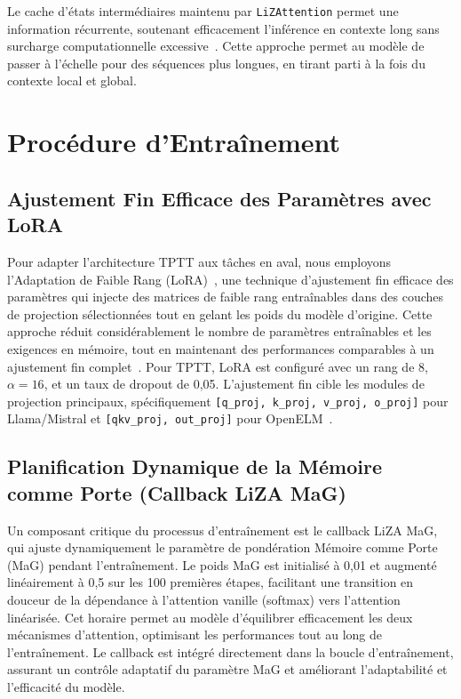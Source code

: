 \documentclass[10pt,a4paper]{article}
\begin{document}
Le cache d'états intermédiaires maintenu par \texttt{LiZAttention} permet une information récurrente, soutenant efficacement l'inférence en contexte long sans surcharge computationnelle excessive~\cite{katharopoulos2020transformers}. Cette approche permet au modèle de passer à l'échelle pour des séquences plus longues, en tirant parti à la fois du contexte local et global.

\section{Procédure d'Entraînement}

\subsection{Ajustement Fin Efficace des Paramètres avec LoRA}

Pour adapter l'architecture TPTT aux tâches en aval, nous employons l'Adaptation de Faible Rang (LoRA)~\cite{hu2022lora, lora_hf}, une technique d'ajustement fin efficace des paramètres qui injecte des matrices de faible rang entraînables dans des couches de projection sélectionnées tout en gelant les poids du modèle d'origine. Cette approche réduit considérablement le nombre de paramètres entraînables et les exigences en mémoire, tout en maintenant des performances comparables à un ajustement fin complet~\cite{hu2022lora, lora_hf}. Pour TPTT, LoRA est configuré avec un rang de 8, $\alpha=16$, et un taux de dropout de 0,05. L'ajustement fin cible les modules de projection principaux, spécifiquement \texttt{[q\_proj, k\_proj, v\_proj, o\_proj]} pour Llama/Mistral et \texttt{[qkv\_proj, out\_proj]} pour OpenELM~\cite{lora_hf}.

\subsection{Planification Dynamique de la Mémoire comme Porte (Callback LiZA MaG)}

Un composant critique du processus d'entraînement est le callback LiZA MaG, qui ajuste dynamiquement le paramètre de pondération Mémoire comme Porte (MaG) pendant l'entraînement. Le poids MaG est initialisé à 0,01 et augmenté linéairement à 0,5 sur les 100 premières étapes, facilitant une transition en douceur de la dépendance à l'attention vanille (softmax) vers l'attention linéarisée. Cet horaire permet au modèle d'équilibrer efficacement les deux mécanismes d'attention, optimisant les performances tout au long de l'entraînement. Le callback est intégré directement dans la boucle d'entraînement, assurant un contrôle adaptatif du paramètre MaG et améliorant l'adaptabilité et l'efficacité du modèle.
\end{document}
